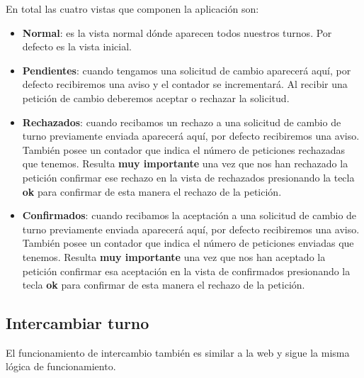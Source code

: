 En total las cuatro vistas que componen la aplicación son: 
\begin{itemize}

\item \textbf{Normal}: es la vista normal dónde aparecen todos nuestros turnos. Por defecto es la vista inicial.


\item \textbf{Pendientes}: cuando tengamos una solicitud de cambio aparecerá aquí, por defecto recibiremos una aviso y el contador se incrementará. Al recibir una petición de cambio deberemos aceptar o rechazar la solicitud.


\item \textbf{Rechazados}: cuando recibamos un rechazo a una solicitud de cambio de turno previamente enviada aparecerá aquí, por defecto recibiremos una aviso. También posee un contador que indica el número de peticiones rechazadas que tenemos. Resulta \textbf{muy importante} una vez que nos han rechazado la petición confirmar ese rechazo en la vista de rechazados presionando la tecla \textbf{ok} para confirmar de esta manera el rechazo de la petición. 


\item \textbf{Confirmados}: cuando recibamos la aceptación a una solicitud de cambio de turno previamente enviada aparecerá aquí, por defecto recibiremos una aviso. También posee un contador que indica el número de peticiones enviadas que tenemos. Resulta \textbf{muy importante} una vez que nos han aceptado la petición confirmar esa aceptación en la vista de confirmados presionando la tecla \textbf{ok} para confirmar de esta manera el rechazo de la petición.


\end{itemize} 


\subsection{Intercambiar turno}
El funcionamiento de intercambio también es similar a la web y sigue la misma lógica de funcionamiento.


